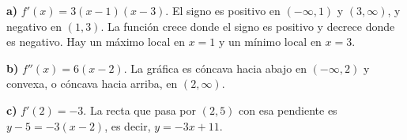 \textbf{a)} $f'(x)=3(x-1)(x-3)$. El signo es positivo en $(-\infty,1)$ y $(3,\infty)$, y negativo en $(1,3)$. La función crece donde el signo es positivo y decrece donde es negativo. Hay un máximo local en $x=1$ y un mínimo local en $x=3$.

\textbf{b)} $f''(x)=6(x-2)$. La gráfica es cóncava hacia abajo en $(-\infty,2)$ y convexa, o cóncava hacia arriba, en $(2,\infty)$.

\textbf{c)} $f'(2)=-3$. La recta que pasa por $(2,5)$ con esa pendiente es $y-5=-3(x-2)$, es decir, $\boxed{y=-3x+11}$.
